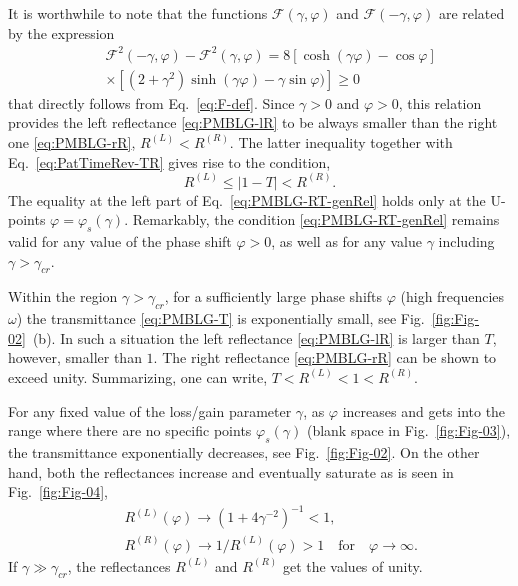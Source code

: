 \documentclass[aps,pra,reprint,showpacs,bibnotes,preprintnumbers,twoside,eqsecnum]{revtex4-1}
\begin{document}
It is worthwhile to note that the functions $\mathcal{F}(\gamma,\varphi)$ and $\mathcal{F}(-\gamma,\varphi)$ are related by the expression
%
\begin{eqnarray}\label{eq:PMBLG-F-rel}
&&\mathcal{F}^2(-\gamma,\varphi)-\mathcal{F}^2(\gamma,\varphi)=8[\cosh(\gamma\varphi)-\cos\varphi]\nonumber\\
&&\times[(2+\gamma^2)\sinh(\gamma\varphi)-\gamma\sin\varphi)]\geqslant0
\end{eqnarray}
that directly follows from Eq.~\eqref{eq:F-def}. Since $\gamma>0$ and $\varphi>0$, this relation provides the left reflectance \eqref{eq:PMBLG-lR} to be always smaller than the right one \eqref{eq:PMBLG-rR}, $R^{(L)}<R^{(R)}$. The latter inequality together with Eq.~\eqref{eq:PatTimeRev-TR} gives rise to the condition,
%
\begin{equation}\label{eq:PMBLG-RT-genRel}
R^{(L)}\leqslant\left|1-T\right|<R^{(R)}.
\end{equation}
The equality at the left part of Eq.~\eqref{eq:PMBLG-RT-genRel} holds only at the U-points $\varphi=\varphi_s(\gamma)$. Remarkably, the condition \eqref{eq:PMBLG-RT-genRel} remains valid for any value of the phase shift $\varphi>0$, as well as for any value $\gamma$ including $\gamma>\gamma_{cr}$.

Within the region $\gamma>\gamma_{cr}$, for a sufficiently large phase shifts $\varphi$ (high frequencies $\omega$) the transmittance \eqref{eq:PMBLG-T} is exponentially small, see Fig.~\ref{fig:Fig-02}~(b). In such a situation the left reflectance \eqref{eq:PMBLG-lR} is larger than $T$, however, smaller than $1$. The right reflectance \eqref{eq:PMBLG-rR} can be shown to exceed unity. Summarizing, one can write, $T<R^{(L)}<1<R^{(R)}$.

For any fixed value of the loss/gain parameter $\gamma$, as $\varphi$ increases and gets into the range where there are no specific points $\varphi_s(\gamma)$ (blank space in Fig.~\ref{fig:Fig-03}), the transmittance exponentially decreases, see Fig.~\ref{fig:Fig-02}. On the other hand,  both the reflectances increase and eventually saturate as is seen in Fig.~\ref{fig:Fig-04},
%
\begin{eqnarray}\label{eq:PMBLG-Rsat}
&&R^{(L)}(\varphi)\to(1+4\gamma^{-2})^{-1}<1,\nonumber\\
&&R^{(R)}(\varphi)\to1/R^{(L)}(\varphi)>1\quad\mathrm{for}\quad\varphi\to\infty.
\end{eqnarray}
If $\gamma\gg\gamma_{cr}$, the reflectances $R^{(L)}$ and $R^{(R)}$ get the values of unity.
\end{document}
